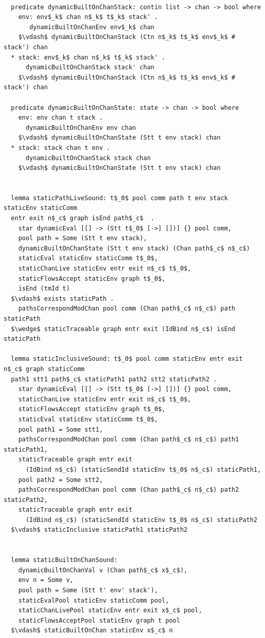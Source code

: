 \documentclass[letterpaper, 11pt]{extarticle}
\begin{document}
\begin{lstlisting}[language=logic, mathescape]

  predicate dynamicBuiltOnChanStack: contin list -> chan -> bool where
    env: env$_k$ chan n$_k$ t$_k$ stack' .
       dynamicBuiltOnChanEnv env$_k$ chan
    $\vdash$ dynamicBuiltOnChanStack (Ctn n$_k$ t$_k$ env$_k$ # stack') chan
  * stack: env$_k$ chan n$_k$ t$_k$ stack' .
      dynamicBuiltOnChanStack stack' chan
    $\vdash$ dynamicBuiltOnChanStack (Ctn n$_k$ t$_k$ env$_k$ # stack') chan
  
  predicate dynamicBuiltOnChanState: state -> chan -> bool where
    env: env chan t stack . 
      dynamicBuiltOnChanEnv env chan
    $\vdash$ dynamicBuiltOnChanState (Stt t env stack) chan
  * stack: stack chan t env .
      dynamicBuiltOnChanStack stack chan
    $\vdash$ dynamicBuiltOnChanState (Stt t env stack) chan


  lemma staticPathLiveSound: t$_0$ pool comm path t env stack staticEnv staticComm
  entr exit n$_c$ graph isEnd path$_c$  . 
    star dynamicEval [[] -> (Stt t$_0$ [->] [])] {} pool comm,
    pool path = Some (Stt t env stack),
    dynamicBuiltOnChanState (Stt t env stack) (Chan path$_c$ n$_c$)
    staticEval staticEnv staticComm t$_0$,
    staticChanLive staticEnv entr exit n$_c$ t$_0$,
    staticFlowsAccept staticEnv graph t$_0$, 
    isEnd (tmId t)
  $\vdash$ exists staticPath . 
    pathsCorrespondModChan pool comm (Chan path$_c$ n$_c$) path staticPath
  $\wedge$ staticTraceable graph entr exit (IdBind n$_c$) isEnd staticPath

  lemma staticInclusiveSound: t$_0$ pool comm staticEnv entr exit n$_c$ graph staticComm
  path1 stt1 path$_c$ staticPath1 path2 stt2 staticPath2 .
    star dynamicEval [[] -> (Stt t$_0$ [->] [])] {} pool comm, 
    staticChanLive staticEnv entr exit n$_c$ t$_0$, 
    staticFlowsAccept staticEnv graph t$_0$, 
    staticEval staticEnv staticComm t$_0$, 
    pool path1 = Some stt1, 
    pathsCorrespondModChan pool comm (Chan path$_c$ n$_c$) path1 staticPath1, 
    staticTraceable graph entr exit
      (IdBind n$_c$) (staticSendId staticEnv t$_0$ n$_c$) staticPath1, 
    pool path2 = Some stt2, 
    pathsCorrespondModChan pool comm (Chan path$_c$ n$_c$) path2 staticPath2, 
    staticTraceable graph entr exit
      (IdBind n$_c$) (staticSendId staticEnv t$_0$ n$_c$) staticPath2
  $\vdash$ staticInclusive staticPath1 staticPath2


  lemma staticBuiltOnChanSound:
    dynamicBuiltOnChanVal v (Chan path$_c$ x$_c$),
    env n = Some v,
    pool path = Some (Stt t' env' stack'),
    staticEvalPool staticEnv staticComm pool,
    staticChanLivePool staticEnv entr exit x$_c$ pool,
    staticFlowsAcceptPool staticEnv graph t pool
  $\vdash$ staticBuiltOnChan staticEnv x$_c$ n


\end{lstlisting}
\end{document}
